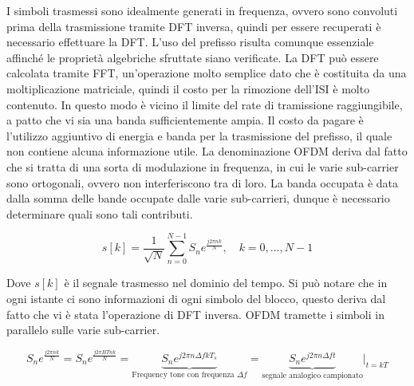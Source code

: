 


I simboli trasmessi sono idealmente generati in frequenza, ovvero sono convoluti prima della trasmissione tramite DFT inversa, quindi per essere recuperati è necessario effettuare la DFT. L'uso del prefisso risulta comunque essenziale affinché le proprietà algebriche sfruttate siano verificate. 
La DFT può essere calcolata tramite FFT, un'operazione molto semplice dato che è costituita da una moltiplicazione matriciale, quindi il costo per la rimozione dell'ISI è molto contenuto. In questo modo è vicino il limite del rate di tramissione raggiungibile, a patto che vi sia una banda sufficientemente ampia.
Il costo da pagare è l'utilizzo aggiuntivo di energia e banda per la trasmissione del prefisso, il quale non contiene alcuna informazione utile.
La denominazione OFDM deriva dal fatto che si tratta di una sorta di modulazione in frequenza, in cui le varie sub-carrier sono ortogonali, ovvero non interferiscono tra di loro. La banda occupata è data dalla somma delle bande occupate dalle varie sub-carrieri, dunque è necessario determinare quali sono tali contributi.

\[
    s[k] = \frac{1}{\sqrt{N}} \sum_{n=0}^{N-1} S_n e^{\frac{j2\pi nk}{N}}, \quad k = 0, \ldots, N-1
\]

Dove $s[k]$ è il segnale trasmesso nel dominio del tempo. Si può notare che in ogni istante ci sono informazioni di ogni simbolo del blocco, questo deriva dal fatto che vi è stata l'operazione di DFT inversa. OFDM tramette i simboli in parallelo sulle varie sub-carrier. 


\[
    S_n e^{\frac{j2\pi nk}{N}} = S_n e^{\frac{j2\pi BTnk}{N}} = \underbrace{S_n e^{j2\pi n\Delta f k T_s}}_{\text{Frequency tone con frequenza $\Delta f$}} = \underbrace{S_n e^{j 2 \pi n \Delta f t}}_{\text{segnale analogico campionato}} \bigg|_{t=kT}
\]





